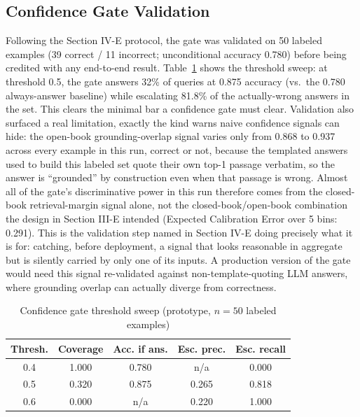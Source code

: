\documentclass[conference]{IEEEtran}
\begin{document}
\subsection{Confidence Gate Validation}
Following the Section IV-E protocol, the gate was validated on 50 labeled examples (39 correct / 11 incorrect; unconditional accuracy 0.780) before being credited with any end-to-end result. Table~\ref{tab:gate} shows the threshold sweep: at threshold 0.5, the gate answers 32\% of queries at 0.875 accuracy (vs.\ the 0.780 always-answer baseline) while escalating 81.8\% of the actually-wrong answers in the set. This clears the minimal bar a confidence gate must clear. Validation also surfaced a real limitation, exactly the kind \cite{intrygue2026} warns naive confidence signals can hide: the open-book grounding-overlap signal varies only from 0.868 to 0.937 across every example in this run, correct or not, because the templated answers used to build this labeled set quote their own top-1 passage verbatim, so the answer is ``grounded'' by construction even when that passage is wrong. Almost all of the gate's discriminative power in this run therefore comes from the closed-book retrieval-margin signal alone, not the closed-book/open-book combination the design in Section III-E intended (Expected Calibration Error over 5 bins: 0.291). This is the validation step named in Section IV-E doing precisely what it is for: catching, before deployment, a signal that looks reasonable in aggregate but is silently carried by only one of its inputs. A production version of the gate would need this signal re-validated against non-template-quoting LLM answers, where grounding overlap can actually diverge from correctness.

\begin{table}[t]
\caption{Confidence gate threshold sweep (prototype, $n{=}50$ labeled examples)}
\begin{center}
\begin{tabular}{@{}ccccc@{}}
\toprule
\textbf{Thresh.} & \textbf{Coverage} & \textbf{Acc. if ans.} & \textbf{Esc. prec.} & \textbf{Esc. recall} \\
\midrule
0.4 & 1.000 & 0.780 & n/a & 0.000 \\
0.5 & 0.320 & 0.875 & 0.265 & 0.818 \\
0.6 & 0.000 & n/a & 0.220 & 1.000 \\
\bottomrule
\end{tabular}
\end{center}
\label{tab:gate}
\end{table}
\end{document}
